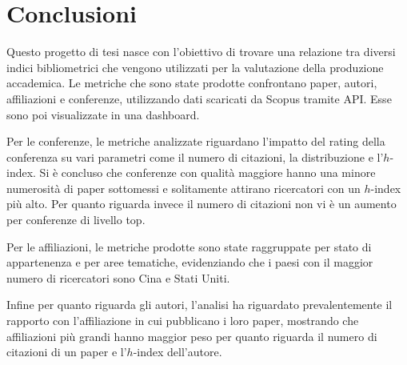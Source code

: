 \chapter{Conclusioni}

Questo progetto di tesi nasce con l'obiettivo di trovare una relazione tra diversi indici bibliometrici che vengono utilizzati per la valutazione della produzione accademica. Le metriche che sono state prodotte confrontano paper, autori, affiliazioni e conferenze, utilizzando dati scaricati da Scopus tramite API. Esse sono poi visualizzate in una dashboard.

Per le conferenze, le metriche analizzate riguardano l'impatto del rating della conferenza su vari parametri come il numero di citazioni, la distribuzione e l'$h$-index. Si è concluso che conferenze con qualità maggiore hanno una minore numerosità di paper sottomessi e solitamente attirano ricercatori con un $h$-index più alto. Per quanto riguarda invece il numero di citazioni non vi è un aumento per conferenze di livello top. 

Per le affiliazioni, le metriche prodotte sono state raggruppate per stato di appartenenza e per aree tematiche, evidenziando che i paesi con il maggior numero di ricercatori sono Cina e Stati Uniti.

Infine per quanto riguarda gli autori, l'analisi ha riguardato prevalentemente il rapporto con l'affiliazione in cui pubblicano i loro paper, mostrando che affiliazioni più grandi hanno maggior peso per quanto riguarda il numero di citazioni di un paper e l'$h$-index dell'autore.
